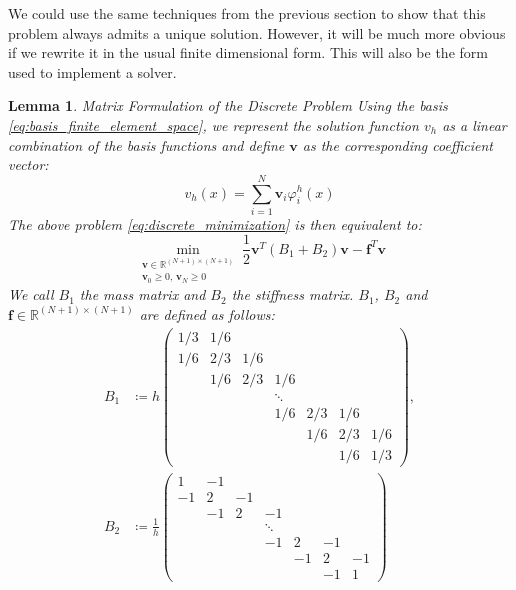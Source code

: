 \documentclass[headsepline,footsepline,footinclude=false,oneside,fontsize=11pt,paper=a4,listof=totoc,bibliography=totoc]{scrbook} %
\newtheorem{lemma}{Lemma}
\begin{document}
We could use the same techniques from the previous section to show that this problem always admits a unique solution. However, it will be much more obvious if we rewrite it in the usual finite dimensional form. This will also be the form used to implement a solver.

\begin{lemma} Matrix Formulation of the Discrete Problem \newline
	Using the basis \eqref{eq:basis_finite_element_space}, we represent the solution function $v_h$ as a linear combination of the basis functions and define $\mathbf{v}$ as the corresponding coefficient vector:
	\begin{equation} \label{eq:basis_representation_v_h}
	v_h(x) = \sum_{i=1}^{N} \mathbf{v}_i \varphi_i^h(x)
	\end{equation}
		The above problem \eqref{eq:discrete_minimization} is then equivalent to:
		\begin{equation}
		\min_{\substack{\mathbf{v} \in \mathbb{R}^{(N+1)\times(N+1)}\\ \mathbf{v}_{0} \geq 0,\, \mathbf{v}_N \geq 0}} \frac{1}{2} \mathbf{v}^T (B_1 + B_2) \mathbf{v} - \mathbf{f}^T  \mathbf{v}
		\end{equation}
		We call $B_1$ the \emph{mass matrix} and $B_2$ the \emph{stiffness matrix}. $B_1$, $B_2$ and $\mathbf{f} \in \mathbb{R}^{(N+1)\times(N+1)}$ are defined as follows:
		\begin{align*}
		B_1 &\coloneqq 			h	\begin{pmatrix}
		1/3& 1/6 & & & & & \\
		1/6& 2/3& 1/6 & & & & \\
		& 1/6& 2/3& 1/6 & & & \\
		& & & \ddots & & & \\
		& & & 1/6& 2/3& 1/6 & \\
		& & & & 1/6& 2/3& 1/6 \\
		& & & & & 1/6& 1/3
		\end{pmatrix}, \\
		 B_2 &\coloneqq \frac{1}{h} 			\begin{pmatrix}
		1& -1 & & & & & \\
		-1& 2& -1 & & & & \\
		& -1& 2& -1 & & & \\
		& & & \ddots & & & \\
		& & & -1& 2& -1 & \\
		& & & & -1& 2& -1 \\
		& & & & & -1& 1
		\end{pmatrix} \\

\end{align*}
\end{lemma}
\end{document}
